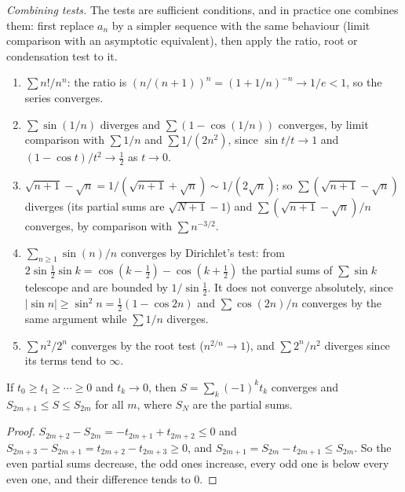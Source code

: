 \begin{example}\label{real-analysis:example-series-tests}
\emph{Combining tests.} The tests are sufficient conditions, and in practice one combines them: first replace $a_n$ by a simpler sequence with the same behaviour (limit comparison with an
asymptotic equivalent), then apply the ratio, root or condensation test to it.
\begin{enumerate}
\item $\sum n!/n^n$: the ratio is $(n/(n + 1))^n = (1 + 1/n)^{-n} \to 1/e < 1$, so the series converges.
\item $\sum\sin(1/n)$ diverges and $\sum(1 - \cos(1/n))$ converges, by limit comparison with $\sum 1/n$ and $\sum 1/(2n^2)$, since $\sin t/t \to 1$ and $(1 - \cos t)/t^2 \to \frac12$ as $t \to 0$.
\item $\sqrt{n + 1} - \sqrt n = 1/(\sqrt{n + 1} + \sqrt n) \sim 1/(2\sqrt n)$; so $\sum(\sqrt{n + 1} - \sqrt n)$ diverges (its partial sums are $\sqrt{N + 1} - 1$) and
$\sum(\sqrt{n + 1} - \sqrt n)/n$ converges, by comparison with $\sum n^{-3/2}$.
\item $\sum_{n \geq 1}\sin(n)/n$ converges by Dirichlet's test: from $2\sin\frac12\sin k = \cos(k - \frac12) - \cos(k + \frac12)$ the partial sums of $\sum\sin k$ telescope and are bounded by
$1/\sin\frac12$. It does not converge absolutely, since $|\sin n| \geq \sin^2n = \frac12(1 - \cos 2n)$ and $\sum\cos(2n)/n$ converges by the same argument while $\sum 1/n$ diverges.
\item $\sum n^2/2^n$ converges by the root test ($n^{2/n} \to 1$), and $\sum 2^n/n^2$ diverges since its terms tend to $\infty$.
\end{enumerate}
\end{example}

\begin{lemma}\label{real-analysis:lemma-alternating}
If $t_0 \geq t_1 \geq \cdots \geq 0$ and $t_k \to 0$, then $S = \sum_k(-1)^kt_k$ converges and $S_{2m+1} \leq S \leq S_{2m}$ for all $m$, where $S_N$ are the partial sums.
\end{lemma}

\begin{proof}
$S_{2m+2} - S_{2m} = -t_{2m+1} + t_{2m+2} \leq 0$ and $S_{2m+3} - S_{2m+1} = t_{2m+2} - t_{2m+3} \geq 0$, and $S_{2m+1} = S_{2m} - t_{2m+1} \leq S_{2m}$. So the even partial sums decrease, the odd ones
increase, every odd one is below every even one, and their difference tends to $0$.
\end{proof}


